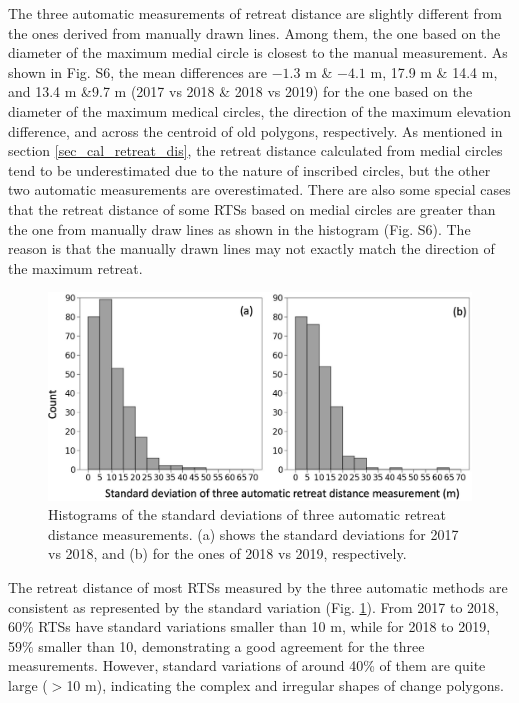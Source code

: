 \documentclass[authoryear,preprint,review,12pt]{elsarticle}
\begin{document}
The three automatic measurements of retreat distance are slightly different from the ones derived from manually drawn lines. Among them, the one based on the diameter of the maximum medial circle is closest to the manual measurement. 
As shown in Fig. S6, the mean differences are $-1.3$ m \& $-4.1$ m, 17.9 m \& 14.4 m, and 13.4 m \&9.7 m (2017 vs 2018 \& 2018 vs 2019) for the one based on the diameter of the maximum medical circles, the direction of the maximum elevation difference, and across the centroid of old polygons, respectively. 
As mentioned in section \ref{sec_cal_retreat_dis}, the retreat distance calculated from medial circles tend to be underestimated due to the nature of inscribed circles, but the other two automatic measurements are overestimated. 
There are also some special cases that the retreat distance of some RTSs based on medial circles are greater than the one from manually draw lines as shown in the histogram (Fig. S6).
The reason is that the manually drawn lines may not exactly match the direction of the maximum retreat.  

\begin{figure} 
	\centering
	\includegraphics[width=14cm]{figs/standard_deviation_v2_trim.jpg}
	\caption{Histograms of the standard deviations of three automatic retreat distance measurements. (a) shows the standard deviations for 2017 vs 2018, and (b) for the ones of 2018 vs 2019, respectively.}
	\label{fig_re_dis_standard_var}
\end{figure}

The retreat distance of most RTSs measured by the three automatic methods are consistent as represented by the standard variation (Fig. \ref{fig_re_dis_standard_var}).
From 2017 to 2018, 60\% RTSs have standard variations smaller than 10 m, while for 2018 to 2019, 59\% smaller than 10, demonstrating a good agreement for the three measurements.
However, standard variations of around 40\% of them are quite large ($>$10 m), indicating the complex and irregular shapes of change polygons. 
 
\end{document}
